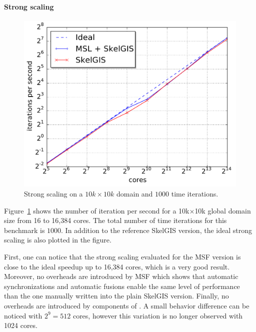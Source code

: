 
\paragraph{\textbf{Strong scaling}}
\begin{figure}[t]\begin{center}
  \includegraphics[width=.6\textwidth]{../results/strong_scaling/10K_1K/median_strong.pdf}
  \caption{Strong scaling on a $10k \times 10k$ domain and $1000$ time iterations.}
  \label{fig:strong}
\end{center}\end{figure}

Figure~\ref{fig:strong} shows the number of iteration per second for a 10k$\times$10k global domain size from 16 to 16,384 cores. The total number of time iterations for this benchmark is $1000$. In addition to the reference SkelGIS version, the ideal strong scaling is also plotted in the figure.

First, one can notice that the strong scaling evaluated for the MSF version is close to the ideal speedup up to 16,384 cores, which is a very good result. Moreover, no overheads are introduced by MSF which shows that automatic synchronizations and automatic fusions enable the same level of performance than the one manually written into the plain SkelGIS version. Finally, no overheads are introduced by components of \llc. A small behavior difference can be noticed with $2^9=512$ cores, however this variation is no longer observed with 1024 cores. %

